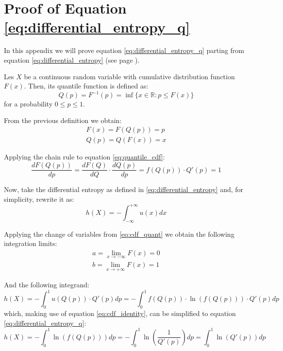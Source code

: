 \chapter{Proof of Equation \ref{eq:differential_entropy_q}}\label{entropy_proof}

In this appendix we will prove equation \ref{eq:differential_entropy_q} parting from equation \ref{eq:differential_entropy} (see page \pageref{eq:differential_entropy}).

Les $X$ be a continuous random variable with cumulative distribution function $F(x)$. Then, its quantile function is defined as:
\begin{equation}
Q(p) = F^{-1}(p) = \inf\{x \in \mathbb{R} : p \leq F(x)\}
\end{equation}
for a probability $0 \leq p \leq 1$.

From the previous definition we obtain:
\begin{align} 
F(x) = F(Q(p)) = p \label{eq:quantile_cdf} \\ 
Q(p) = Q(F(x)) = x \label{eq:cdf_quant}
\end{align}

Applying the chain rule to equation \ref{eq:quantile_cdf}:
\begin{equation}\label{eq:cdf_identity}
\frac{dF(Q(p))}{dp} = \frac{dF(Q)}{dQ} \cdot \frac{dQ(p)}{dp} = f(Q(p)) \cdot Q'(p) = 1
\end{equation}

Now, take the differential entropy as defined in \ref{eq:differential_entropy} and, for simplicity, rewrite it as:
\begin{equation}
h(X) = - \int_{-\infty}^{+\infty} u(x) dx
\end{equation}

Applying the change of variables from \ref{eq:cdf_quant} we obtain the following integration limits:
\begin{align}
a = \lim_{x \to -\infty} F(x) = 0\\
b = \lim_{x \to +\infty} F(x) = 1
\end{align}

And the following integrand:
\begin{equation}
h(X) = - \int_{0}^{1} u(Q(p)) \cdot Q'(p) dp = - \int_{0}^{1} f(Q(p)) \cdot \ln(f(Q(p))) \cdot Q'(p) dp
\end{equation}
which, making use of equation \ref{eq:cdf_identity}, can be simplified to equation \ref{eq:differential_entropy_q}:
\begin{equation}
h(X) = -  \int_{0}^{1} \ln\left(f(Q(p))\right) dp = - \int_{0}^{1} \ln\left(\frac{1}{Q'(p)}\right) dp = \int_{0}^{1} \ln\left(Q'(p)\right) dp
\end{equation}